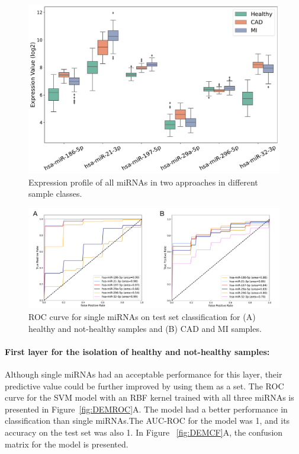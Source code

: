\documentclass[sn-mathphys,Numbered]{sn-jnl}%
\theoremstyle{thmstyleone}%
\theoremstyle{thmstyletwo}%
\theoremstyle{thmstylethree}%
\begin{document}
\begin{figure}
\centering 
\includegraphics[width=0.9\linewidth]{Expressionforall}
\caption{Expression profile of all miRNAs in two approaches in different sample classes.}\label{fig:Expall}
\end{figure}

\begin{figure}
\centering 
\includegraphics[width=0.95\linewidth]{miRs ROCs}
\caption{ROC curve for single miRNAs on test set classification for (A) healthy and not-healthy samples and (B) CAD and MI samples.}\label{fig:miRROC}
\end{figure}

\paragraph{First layer for the isolation of healthy and not-healthy
samples:}\label{first-layer-for-the-isolation-of-healthy-and-not-healthy-samples-2}

Although single miRNAs had an acceptable performance for this layer,
their predictive value could be further improved by using them as a set.
The ROC curve for the SVM model with an RBF kernel trained with all
three miRNAs is presented in Figure~\ref{fig:DEMROC}A. The model had a
better performance in classification than single miRNAs.The AUC-ROC for
the model was 1, and its accuracy on the test set was also 1. In Figure
~\ref{fig:DEMCF}A, the confusion matrix for the model is presented.
\end{document}
